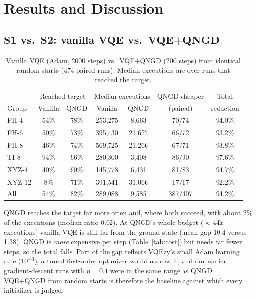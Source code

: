 \documentclass{ssnreview}
\begin{document}
\chapter{Results and Discussion}

\section{S1 vs.\ S2: vanilla VQE vs.\ VQE+QNGD}\label{sec:s1s2}

\begin{table}[H]
\centering
\caption{Vanilla VQE (Adam, 2000 steps) vs.\ VQE+QNGD (200 steps) from identical random starts
(474 paired runs). Median executions are over runs that reached the target.}\label{tab:s1s2}
\begin{tabular}{lcccccc}
\toprule
 & \multicolumn{2}{c}{Reached target} & \multicolumn{2}{c}{Median executions} & QNGD cheaper & Total \\
Group & Vanilla & QNGD & Vanilla & QNGD & (paired) & reduction \\
\midrule
FH-4   & 54\% & 78\% & 253{,}275 & 8{,}663  & 70/74  & 94.0\% \\
FH-6   & 50\% & 73\% & 395{,}430 & 21{,}627 & 66/72  & 93.2\% \\
FH-8   & 46\% & 74\% & 569{,}725 & 21{,}266 & 67/71  & 93.8\% \\
TI-8   & 94\% & 96\% & 280{,}800 & 3{,}408  & 86/90  & 97.6\% \\
XYZ-4  & 40\% & 90\% & 145{,}778 & 6{,}431  & 81/83  & 94.7\% \\
XYZ-12 & 8\%  & 71\% & 391{,}541 & 31{,}066 & 17/17  & 92.2\% \\
\midrule
All    & 54\% & 82\% & 289{,}088 & 9{,}585  & 387/407 & 94.2\% \\
\bottomrule
\end{tabular}
\end{table}

QNGD reaches the target far more often and, where both succeed, with about 2\% of the
executions (median ratio 0.02). At QNGD's whole budget ($\approx$44k executions) vanilla VQE is
still far from the ground state (mean gap 10.4 versus 1.38). QNGD is \emph{more} expensive per
step (Table~\ref{tab:cost}) but needs far fewer steps, so the total falls. Part of the gap
reflects VQEzy's small Adam learning rate ($10^{-3}$); a tuned first-order optimizer would
narrow it, and our earlier gradient-descent runs with $\eta=0.1$ were in the same range as
QNGD. VQE+QNGD from random starts is therefore the baseline against which every initializer
is judged.
\end{document}
